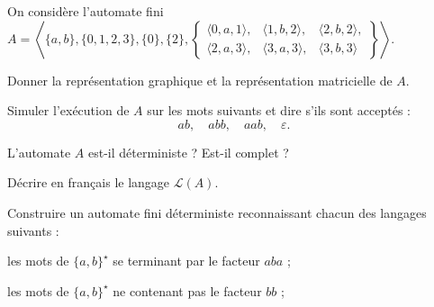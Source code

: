 
\begingroup

\begin{exercice}\label{exo:lexing/automata/revision}

  On considère l'automate fini $A = \left\langle \{a, b\}, \{0,1,2,3\}, \{0\}, \{2\}, \left\{\begin{array}{lll}
    \langle 0, a, 1\rangle, &
    \langle 1, b, 2\rangle, &
    \langle 2, b, 2\rangle, \\
    \langle 2, a, 3\rangle, &
    \langle 3, a, 3\rangle, &
    \langle 3, b, 3\rangle
  \end{array}\right\} \right\rangle$.

  \begin{questions}

  \item Donner la représentation graphique et la représentation matricielle de $A$.

  \item Simuler l'exécution de $A$ sur les mots suivants et dire s'ils sont acceptés :
    $$ab,\quad abb,\quad aab,\quad \varepsilon.$$

  \item L'automate $A$ est-il déterministe ? Est-il complet ? 
    
  \item Décrire en français le langage $\mathcal{L}(A)$.

  \end{questions}

  Construire un automate fini déterministe reconnaissant chacun des langages suivants :
  
  \begin{questions}

  \item les mots de $\{a,b\}^\star$ se terminant par le facteur $aba$ ;

  \item les mots de $\{a,b\}^\star$ ne contenant pas le facteur $bb$ ;

  \end{questions}

\end{exercice}

